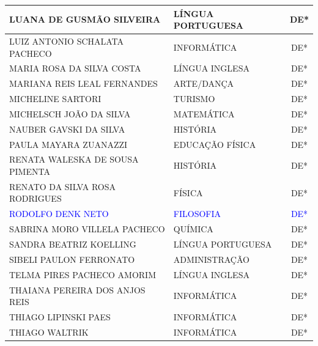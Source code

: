 \documentclass{../../modelos/latex-shared/ifsc-ppc}
\newcommand{\revisao}[1]{\textcolor{blue}{#1}}
\newcommand{\revisao}[1]{#1}
\begin{document}
\begin{xltabular}{\linewidth}{|X|p{4cm}|c|}
LUANA DE GUSMÃO SILVEIRA & LÍNGUA PORTUGUESA & DE* \\ \hline
LUIZ ANTONIO SCHALATA PACHECO & INFORMÁTICA & DE* \\ \hline
MARIA ROSA DA SILVA COSTA & LÍNGUA INGLESA & DE* \\ \hline
MARIANA REIS LEAL FERNANDES & ARTE/DANÇA & DE* \\ \hline
MICHELINE SARTORI & TURISMO & DE* \\ \hline
MICHELSCH JOÃO DA SILVA & MATEMÁTICA & DE* \\ \hline
NAUBER GAVSKI DA SILVA & HISTÓRIA & DE* \\ \hline
PAULA MAYARA ZUANAZZI & EDUCAÇÃO FÍSICA & DE* \\ \hline
RENATA WALESKA DE SOUSA PIMENTA & HISTÓRIA & DE* \\ \hline
RENATO DA SILVA ROSA RODRIGUES & FÍSICA & DE* \\ \hline
\revisao{RODOLFO DENK NETO} & \revisao{FILOSOFIA} & \revisao{DE*} \\ \hline
SABRINA MORO VILLELA PACHECO & QUÍMICA & DE* \\ \hline
SANDRA BEATRIZ KOELLING & LÍNGUA PORTUGUESA & DE* \\ \hline
SIBELI PAULON FERRONATO & ADMINISTRAÇÃO & DE* \\ \hline
TELMA PIRES PACHECO AMORIM & LÍNGUA INGLESA & DE* \\ \hline
THAIANA PEREIRA DOS ANJOS REIS & INFORMÁTICA & DE* \\ \hline
THIAGO LIPINSKI PAES & INFORMÁTICA & DE* \\ \hline
THIAGO WALTRIK & INFORMÁTICA & DE* \\ \hline
\end{xltabular}
\end{document}
